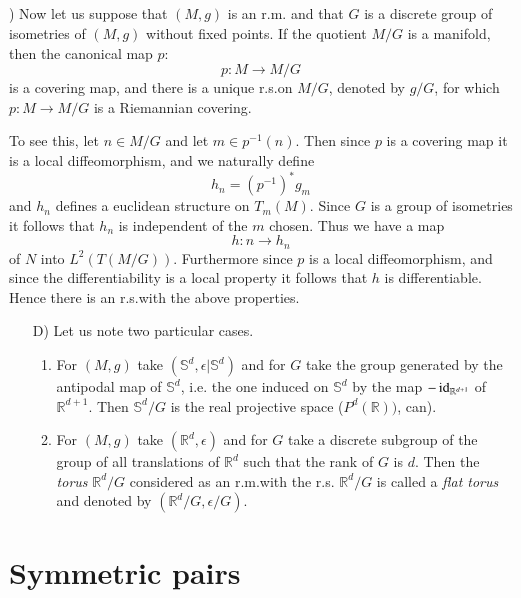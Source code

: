 \subsection{}\label{chap3:3.2.2}) 
Now let us suppose that $(M,g)$
  is an r.m. and that $G$ is a discrete group of isometries of $(M,g)$
  without fixed points. If the quotient $M/G$ is a manifold, then the
  canonical map $p$:
$$
p:M\to M/G
$$
is a covering map, and there is a unique r.s.\@ on $M/G$, denoted by
$g/G$, for which $p:M\to M/G$ is a Riemannian covering.

\quad 
To see this, let $n\in M/G$ and let $m\in p^{-1}(n)$. Then since $p$
is a covering map it is a local diffeomorphism, and we naturally
define
$$
h_{n}=(p^{-1})^{\ast}g_{m}
$$
and $h_{n}$ defines a euclidean structure on $T_{m}(M)$. Since $G$ is
a group \pageoriginale of isometries it follows that $h_{n}$ is
independent of the $m$ chosen. Thus we have a map
$$
h:n\to h_{n}
$$
of $N$ into $L^{2}(T(M/G))$. Furthermore since $p$ is a local
diffeomorphism, and since the differentiability is a local property it
follows that $h$ is differentiable. Hence there is an r.s.\@ with the
above properties.

\begin{enumerate}
\item[D)] Let us note two particular cases.
\begin{enumerate}
\renewcommand{\theenumii}{\arabic{enumii}}
\renewcommand{\labelenumii}{\theenumii.}
\item For $(M,g)$ take $(\mathbb{S}^{d},\epsilon|\mathbb{S}^{d})$ and
  for $G$ take the group generated by the antipodal map of
  $\mathbb{S}^{d}$, i.e. the one induced on $\mathbb{S}^{d}$ by the
  map $-\operatorname{id}_{\mathbb{R}^{d+1}}$ of $\mathbb{R}^{d+1}$. Then
  $\mathbb{S}^{d}/G$ is the real projective space
  ($P^{d}(\mathbb{R}))$, can).

\item For $(M,g)$ take $(\mathbb{R}^{d},\epsilon)$ and for $G$ take a
  discrete subgroup of the group of all translations of
  $\mathbb{R}^{d}$ such that the rank of $G$ is $d$. Then the {\em
    torus} $\mathbb{R}^{d}/G$ considered as an r.m.\@ with the r.s.\@
  $\mathbb{R}^{d}/G$ is called a {\em flat torus} and denoted by
  $(\mathbb{R}^{d}/G,\epsilon/G)$.  
\end{enumerate}
\end{enumerate}

\section{Symmetric pairs}\label{chap3:sec3}

